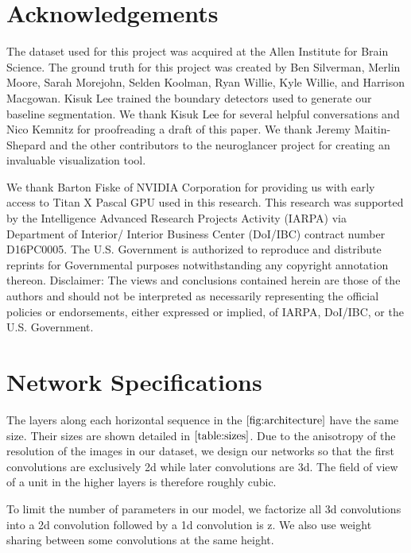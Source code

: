 \documentclass{article}
\begin{document}
\section{Acknowledgements}
The dataset used for this project was acquired at the Allen Institute for Brain Science.
The ground truth for this project was created by Ben Silverman, Merlin Moore, Sarah Morejohn, 
Selden Koolman, Ryan Willie, Kyle Willie, and Harrison Macgowan. Kisuk Lee trained the boundary
detectors used to generate our baseline segmentation. We thank Kisuk Lee for several
helpful conversations and Nico Kemnitz for proofreading a draft of this paper. We thank 
Jeremy Maitin-Shepard and the other contributors to the neuroglancer project for creating an 
invaluable visualization tool.

We thank Barton Fiske of NVIDIA Corporation for providing us with early access to Titan X
Pascal GPU used in this research. This research was supported by the Intelligence Advanced
Research Projects Activity (IARPA) via Department of Interior/ Interior Business Center (DoI/IBC)
contract number D16PC0005. The U.S. Government is authorized to reproduce and distribute reprints
for Governmental purposes notwithstanding any copyright annotation thereon. Disclaimer: The views
and conclusions contained herein are those of the authors and should not be interpreted as necessarily
representing the official policies or endorsements, either expressed or implied, of IARPA, DoI/IBC,
or the U.S. Government.


\appendix
\section{Network Specifications}
The layers along each horizontal sequence in the $\ref{fig:architecture}$ have the same size. Their sizes are shown detailed in $\ref{table:sizes}$.
Due to the anisotropy of the resolution of the images in our dataset, we design our networks so that the first convolutions are exclusively 2d while later convolutions are 3d. The field of view of a unit in the higher layers is therefore roughly cubic.


To limit the number of parameters in our model, we factorize all 3d convolutions into a 2d convolution followed by a 1d convolution is z. We also use weight sharing between some convolutions at the same height.
\end{document}
